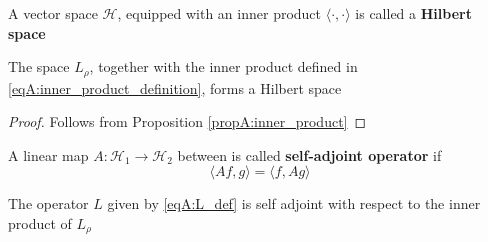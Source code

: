 %
\begin{definition}
A vector space $\mathcal{H}$, equipped with an inner product $\langle\cdot,\cdot\rangle$  is called a \textbf{Hilbert space}
\end{definition}
%
\begin{proposition}
  The space $L_\rho$, together with the inner product defined in \eqref{eqA:inner_product_definition}, forms a Hilbert space
\end{proposition}
\begin{proof}
  Follows from Proposition \ref{propA:inner_product} 
\end{proof}
%
\begin{definition}
  A linear map $A:\mathcal{H}_1\to\mathcal{H}_2$ between is called \textbf{self-adjoint operator} if
  \begin{equation}
    \label{eqA:self_adjoint_def}
    \langle Af, g\rangle = \langle f, Ag\rangle
  \end{equation}
\end{definition}
%
\begin{proposition}
  The operator $L$ given by \eqref{eqA:L_def} is self adjoint with respect to the inner product of $L_\rho$
\end{proposition}



